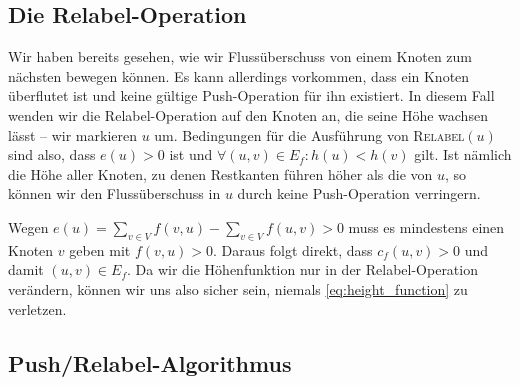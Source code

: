 \documentclass[12pt,a4paper,titlepage,onecolumn,ngerman,bibliography=totocnumbered]{scrartcl}
\theoremstyle{definition}
\theoremstyle{remark}
\newcommand{\pr}{Push/Relabel}
\begin{document}
\subsection{Die Relabel-Operation}
Wir haben bereits gesehen, wie wir Flussüberschuss von einem Knoten zum nächsten bewegen können.
Es kann allerdings vorkommen, dass ein Knoten überflutet ist und keine gültige Push-Operation für ihn existiert.
In diesem Fall wenden wir die Relabel-Operation auf den Knoten an, die seine Höhe wachsen lässt -- wir markieren $u$ um.
Bedingungen für die Ausführung von \textsc{Relabel}$(u)$ sind also, dass $e(u) > 0$ ist und $\forall (u,v)\in E_f: h(u) < h(v)$ gilt.
Ist nämlich die Höhe aller Knoten, zu denen Restkanten führen höher als die von $u$, so können wir den Flussüberschuss in $u$ durch keine Push-Operation verringern.
\begin{algorithm}[H]
    \caption{\textsc{Relabel}$(u)$}
    \label{alg:relabel}
\begin{algorithmic}[1]
\State{}
\end{algorithmic}
\end{algorithm}
Wegen $e(u) = \sum_{v\in V}f(v,u) -\sum_{v\in V}f(u,v) > 0$ muss es mindestens einen Knoten $v$ geben mit $f(v,u) > 0$.
Daraus folgt direkt, dass $c_f(u,v) > 0$ und damit $(u,v)\in E_f$.
Da wir die Höhenfunktion nur in der Relabel-Operation verändern, können wir uns also sicher sein, niemals \eqref{eq:height_function} zu verletzen.

\subsection{\pr -Algorithmus}
\newpage
\printbibliography
\end{document}
